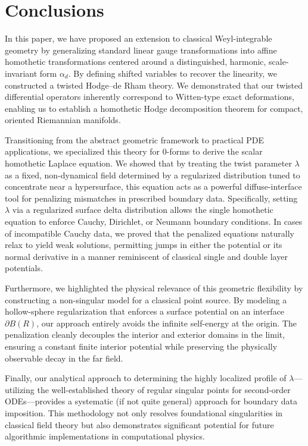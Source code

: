 \documentclass[preprint,12pt]{elsarticle}
\theoremstyle{plain}
\theoremstyle{definition}
\theoremstyle{note}
\begin{document}
\section{Conclusions}\label{sec:Conclusions}

In this paper, we have proposed an extension to classical Weyl-integrable geometry by generalizing standard linear gauge transformations into affine homothetic transformations centered around a distinguished, harmonic, scale-invariant form $\alpha_d$. By defining shifted variables to recover the linearity, we constructed a twisted Hodge--de Rham theory. We demonstrated that our twisted differential operators inherently correspond to Witten-type exact deformations, enabling us to establish a homothetic Hodge decomposition theorem for compact, oriented Riemannian manifolds.

Transitioning from the abstract geometric framework to practical PDE applications, we specialized this theory for $0$-forms to derive the scalar homothetic Laplace equation. We showed that by treating the twist parameter $\lambda$ as a fixed, non-dynamical field determined by a regularized distribution tuned to concentrate near a hypersurface, this equation acts as a powerful diffuse-interface tool for penalizing mismatches in prescribed boundary data. Specifically, setting $\lambda$ via a regularized surface delta distribution allows the single homothetic equation to enforce Cauchy, Dirichlet, or Neumann boundary conditions. In cases of incompatible Cauchy data, we proved that the penalized equations naturally relax to yield weak solutions, permitting jumps in either the potential or its normal derivative in a manner reminiscent of classical single and double layer potentials.

Furthermore, we highlighted the physical relevance of this geometric flexibility by constructing a non-singular model for a classical point source. By modeling a hollow-sphere regularization that enforces a surface potential on an interface $\partial B(R)$, our approach entirely avoids the infinite self-energy at the origin. The penalization cleanly decouples the interior and exterior domains in the limit, ensuring a constant finite interior potential while preserving the physically observable decay in the far field. 

Finally, our analytical approach to determining the highly localized profile of $\lambda$—utilizing the well-established theory of regular singular points for second-order ODEs—provides a systematic (if not quite general) approach for boundary data imposition. This methodology not only resolves foundational singularities in classical field theory but also demonstrates significant potential for future algorithmic implementations in computational physics.
\end{document}
